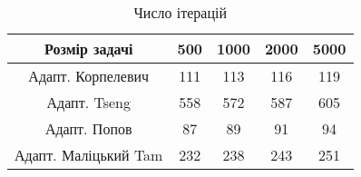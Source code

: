 \begin{table}[H]
	\centering
	\begin{tabular}{|c||c|c|c|c|}\hline
		Розмір задачі & 500 & 1000 & 2000 & 5000 \\ \hline \hline
		Адапт. Корпелевич & 111 & 113 & 116 & 119 \\ \hline
		Адапт. Tseng & 558 & 572 & 587 & 605 \\ \hline
		Адапт. Попов & 87 & 89 & 91 & 94 \\ \hline
		Адапт. Маліцький Tam & 232 & 238 & 243 & 251 \\ \hline
	\end{tabular}
	\caption{Число ітерацій}
\end{table}
